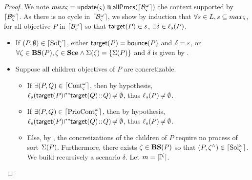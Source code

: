 \begin{proof}
We note $max\varsigma = \mathsf{update}(\varsigma) \Cap \mathsf{allProcs}(\lceil \mathcal{B}_\varsigma^\omega\rceil)$ the context supported by $\lceil \mathcal{B}_\varsigma^\omega\rceil$.
As there is no cycle in $\lceil \mathcal{B}_\varsigma^\omega\rceil$, we show by induction that $\forall s\in L, s\subseteq max\varsigma$, 
for all objective $P$ in $\lceil \mathcal{B}_\varsigma^\omega\rceil$ so that $\mathsf{target}(P) \in s$,
$\exists \delta \in \ell_s(P)$.%

\begin{itemize}
  \item If $(P, \emptyset) \in \lceil \mathrm{Sol}^\omega_\varsigma\rceil$, either $\mathsf{target}(P) = \mathsf{bounce}(P)$ and $\delta = \varepsilon$,
    or $\forall \zeta \in \mathbf{BS}(P), \zeta \in \mathbf{Sce} \wedge \Sigma(\zeta) = \{ \Sigma(P) \}$ and $\delta$ is given by .

  \item Suppose all children objectives of $P$ are concretizable.
  \begin{itemize}
    \item If $\exists (P, Q) \in \lceil \mathrm{Cont}^\omega_\varsigma\rceil$, then by hypothesis,
      $\ell_{s}({\mathsf{target}(P)\!\Rsh^*\!\!\mathsf{target}(Q)} \!::\! Q) \not\nobreak\mkern -2mu = \emptyset$, thus
      $\ell_{s}(P) \not\nobreak\mkern -2mu = \emptyset$.
    \item If $\exists (P, Q) \in \lceil \mathrm{PrioCont}^\omega_\varsigma\rceil$, then by hypothesis,
      $\ell_{s}({\mathsf{target}(P)\!\Rsh^*\!\!\mathsf{target}(Q)} \!::\! Q) \not\nobreak\mkern -2mu = \emptyset$, thus
      $\ell_{s}(P) \not\nobreak\mkern -2mu = \emptyset$.
    \item Else, by , the concretizations of the children of $P$ require no process of sort $\Sigma(P)$.
      Furthermore, there exists $\zeta \in \mathbf{BS}(P)$ so that $(P, \zeta^\wedge) \in \lceil \mathrm{Sol}^\omega_\varsigma\rceil$.
      We build recursively a scenario $\delta$. Let $m = |\mathbb{I}^{\zeta}|$.
      \begin{itemize}

\end{itemize}
\end{itemize}
\end{itemize}
\end{proof}
